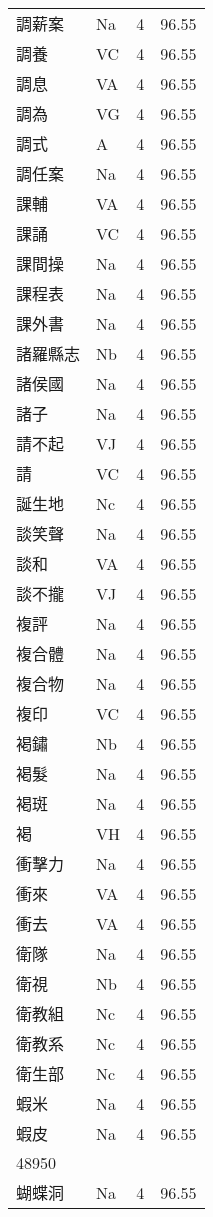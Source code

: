 \documentclass[twocolumn]{book}
\begin{document}
\begin{supertabular}{llrr}
調薪案 & Na & 4 &  96.55\\
調養 & VC & 4 &  96.55\\
調息 & VA & 4 &  96.55\\
調為 & VG & 4 &  96.55\\
調式 & A & 4 &  96.55\\
調任案 & Na & 4 &  96.55\\
課輔 & VA & 4 &  96.55\\
課誦 & VC & 4 &  96.55\\
課間操 & Na & 4 &  96.55\\
課程表 & Na & 4 &  96.55\\
課外書 & Na & 4 &  96.55\\
諸羅縣志 & Nb & 4 &  96.55\\
諸侯國 & Na & 4 &  96.55\\
諸子 & Na & 4 &  96.55\\
請不起 & VJ & 4 &  96.55\\
請 & VC & 4 &  96.55\\
誕生地 & Nc & 4 &  96.55\\
談笑聲 & Na & 4 &  96.55\\
談和 & VA & 4 &  96.55\\
談不攏 & VJ & 4 &  96.55\\
複評 & Na & 4 &  96.55\\
複合體 & Na & 4 &  96.55\\
複合物 & Na & 4 &  96.55\\
複印 & VC & 4 &  96.55\\
褐鏽 & Nb & 4 &  96.55\\
褐髮 & Na & 4 &  96.55\\
褐斑 & Na & 4 &  96.55\\
褐 & VH & 4 &  96.55\\
衝擊力 & Na & 4 &  96.55\\
衝來 & VA & 4 &  96.55\\
衝去 & VA & 4 &  96.55\\
衛隊 & Na & 4 &  96.55\\
衛視 & Nb & 4 &  96.55\\
衛教組 & Nc & 4 &  96.55\\
衛教系 & Nc & 4 &  96.55\\
衛生部 & Nc & 4 &  96.55\\
蝦米 & Na & 4 &  96.55\\
蝦皮 & Na & 4 &  96.55\\
48950\\
蝴蝶洞 & Na & 4 &  96.55\\

\end{supertabular}
\end{document}
